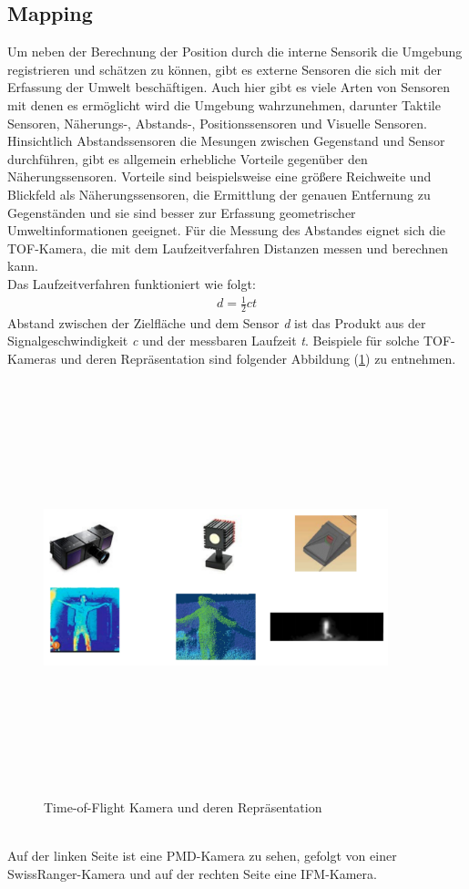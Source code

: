 \subsection{Mapping}
Um neben der Berechnung der Position durch die interne Sensorik die Umgebung registrieren und schätzen zu können, gibt es externe Sensoren 
die sich mit der Erfassung der Umwelt beschäftigen. Auch hier gibt es viele Arten von Sensoren mit denen es ermöglicht wird die Umgebung 
wahrzunehmen, darunter Taktile Sensoren, Näherungs-, Abstands-, Positionssensoren und Visuelle Sensoren. Hinsichtlich Abstandssensoren die 
Mesungen zwischen Gegenstand und Sensor durchführen, gibt es allgemein erhebliche Vorteile gegenüber den Näherungssensoren. Vorteile sind 
beispielsweise eine größere Reichweite und Blickfeld als Näherungssensoren, die Ermittlung der genauen Entfernung zu Gegenständen und sie 
sind besser zur Erfassung geometrischer Umweltinformationen geeignet. Für die Messung des Abstandes eignet sich die \ac{TOF}-Kamera, die 
mit dem Laufzeitverfahren Distanzen messen und berechnen kann. 
\\ 
Das Laufzeitverfahren funktioniert wie folgt:
\begin{align*}
    \textit{d} = \frac{1}{2}\textit{ct}
\end{align*}
Abstand zwischen der Zielfläche und dem Sensor \textit{d} ist das Produkt aus der Signalgeschwindigkeit \textit{c} und der messbaren Laufzeit 
\textit{t}. Beispiele für solche \acs{TOF}-Kameras und deren Repräsentation sind folgender Abbildung (\ref{pic:tofCam}) zu entnehmen.
\begin{figure}[hbt!]
    \centering
    \includegraphics[width=10cm,height=12cm,keepaspectratio]{2Grundlagen/Bilder/tof_kamera.png}
    \caption{Time-of-Flight Kamera und deren Repräsentation \cite{robotik.2020m}}
    \label{pic:tofCam}
\end{figure}
\\ 
Auf der linken Seite ist eine PMD-Kamera zu sehen, gefolgt von einer SwissRanger-Kamera und auf der rechten Seite eine IFM-Kamera.
